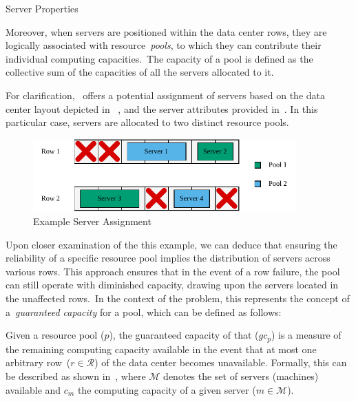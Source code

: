 \begin{table}[ht]
  \centering
  
  \caption{Server Properties}
  \label{table:dc-example-properties}
\end{table}

Moreover, when servers are positioned within the data center rows, they are
logically associated with resource~\textit{pools}, to which they can contribute
their individual computing capacities.~The capacity of a pool is defined as the
collective sum of the capacities of all the servers allocated to it.

For clarification,~ offers a potential
assignment of servers based on the data center layout depicted in
~, and the server attributes provided
in~. In this particular case, servers are
allocated to two distinct resource pools.

\begin{figure}[h]
  \centering
  \includegraphics[width=0.9\textwidth,keepaspectratio]{../assets/dc/dc-example.pdf}
  \caption{Example Server Assignment}
  \label{fig:data-center-layout-with-servers}
\end{figure}

Upon closer examination of the this example, we can deduce that ensuring the
reliability of a specific resource pool implies the distribution of servers
across various rows. This approach ensures that in the event of a row failure,
the pool can still operate with diminished capacity, drawing upon the servers
located in the unaffected rows.~In the context of the problem, this represents
the concept of a~\textit{guaranteed capacity} for a pool, which can be defined
as follows:

Given a resource pool ($p$), the guaranteed capacity of that ($gc_{p}$) is a
measure of the remaining computing capacity available in the event that at most
one arbitrary row~($r \in \mathcal{R}$) of the data center becomes unavailable.
Formally, this can be described as shown in~, where
$\mathcal{M}$ denotes the set of servers (machines) available and $c_{m}$ the
computing capacity of a given server ($m \in \mathcal{M}$).


